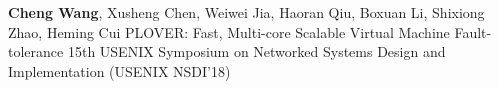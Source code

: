 \cvpub
{\textbf{Cheng Wang}, Xusheng Chen, Weiwei Jia, Haoran Qiu, Boxuan Li, Shixiong Zhao, Heming Cui } %
{PLOVER: Fast, Multi-core Scalable Virtual Machine Fault-tolerance} %
{} %
{} %
{ %
15th USENIX Symposium on Networked Systems Design and Implementation (USENIX NSDI'18)\newline
}
